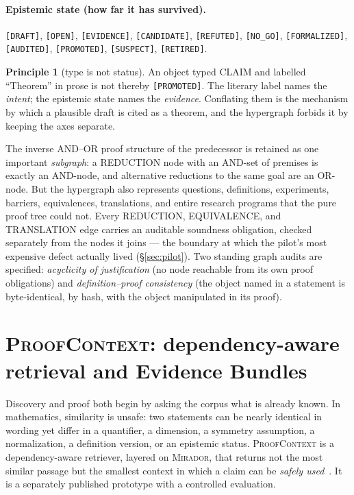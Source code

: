 \documentclass[11pt]{amsart}
\theoremstyle{definition}
\newtheorem{principle}{Principle}
\theoremstyle{remark}
\newcommand{\mirador}{\textsc{Mirador}}
\newcommand{\pc}{\textsc{ProofContext}}
\newcommand{\state}[1]{\texttt{[#1]}}
\newcommand{\otype}[1]{\textsc{#1}}
\begin{document}
\paragraph{Epistemic state (how far it has survived).}
\state{DRAFT}, \state{OPEN}, \state{EVIDENCE}, \state{CANDIDATE},
\state{REFUTED}, \state{NO\_GO}, \state{FORMALIZED}, \state{AUDITED},
\state{PROMOTED}, \state{SUSPECT}, \state{RETIRED}.

\begin{principle}[type is not status]\label{pr:orthogonal}
An object typed \otype{CLAIM} and labelled ``Theorem'' in prose is not thereby
\state{PROMOTED}. The literary label names the \emph{intent}; the epistemic
state names the \emph{evidence}. Conflating them is the mechanism by which a
plausible draft is cited as a theorem, and the hypergraph forbids it by keeping
the axes separate.
\end{principle}

The inverse AND--OR proof structure of the predecessor is retained as one
important \emph{subgraph}: a \otype{REDUCTION} node with an AND-set of premises
is exactly an AND-node, and alternative reductions to the same goal are an
OR-node. But the hypergraph also represents questions, definitions, experiments,
barriers, equivalences, translations, and entire research programs that the pure
proof tree could not. Every \otype{REDUCTION}, \otype{EQUIVALENCE}, and
\otype{TRANSLATION} edge carries an auditable soundness obligation, checked
separately from the nodes it joins --- the boundary at which the pilot's most
expensive defect actually lived (\S\ref{sec:pilot}). Two standing graph audits
are specified: \emph{acyclicity of justification} (no node reachable from its own proof
obligations) and \emph{definition--proof consistency} (the object named in a
statement is byte-identical, by hash, with the object manipulated in its proof).

\section{\pc{}: dependency-aware retrieval and Evidence Bundles}\label{sec:proofcontext}

Discovery and proof both begin by asking the corpus what is already known. In
mathematics, similarity is unsafe: two statements can be nearly identical in
wording yet differ in a quantifier, a dimension, a symmetry assumption, a
normalization, a definition version, or an epistemic status. \pc{} is a
dependency-aware retriever, layered on \mirador{}, that returns not the most
similar passage but the smallest context in which a claim can be
\emph{safely used}~\cite{lucius2026proofcontext}. It is a separately published
prototype with a controlled evaluation.
\end{document}
